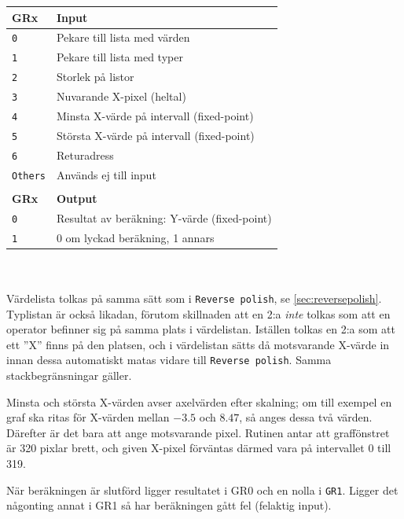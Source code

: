 \documentclass[]{article}
\begin{document}
\begin{tabular}{ll}
	\textbf{GRx}    & \textbf{Input}               \\ \hline
	\texttt{0}      & Pekare till lista med värden \\
	\texttt{1}      & Pekare till lista med typer  \\
	\texttt{2}      & Storlek på listor            \\
	\texttt{3}      & Nuvarande X-pixel (heltal)   \\
	\texttt{4}      & Minsta X-värde på intervall (fixed-point) \\
	\texttt{5}      & Största X-värde på intervall (fixed-point) \\
        \texttt{6}      & Returadress                  \\
        \texttt{Others} & Används ej till input        \\
                        &                              \\
	\textbf{GRx}    & \textbf{Output}              \\ \hline
	\texttt{0}      & Resultat av beräkning: Y-värde (fixed-point) \\
	\texttt{1}      & 0 om lyckad beräkning, 1 annars
\end{tabular}
\\\\
\noindent
Värdelista tolkas på samma sätt som i \texttt{Reverse polish}, se \ref{sec:reversepolish}. Typlistan är också likadan, förutom skillnaden att en 2:a \textit{inte} tolkas som att en operator befinner sig på samma plats i värdelistan. Iställen tolkas en 2:a som att ett ''X'' finns på den platsen, och i värdelistan sätts då motsvarande X-värde in innan dessa automatiskt matas vidare till \texttt{Reverse polish}. Samma stackbegränsningar gäller.

Minsta och största X-värden avser axelvärden efter skalning; om till exempel en graf ska ritas för X-värden mellan $-3.5$ och $8.47$, så anges dessa två värden. Därefter är det bara att ange motsvarande pixel. Rutinen antar att graffönstret är 320 pixlar brett, och given X-pixel förväntas därmed vara på intervallet 0 till 319.

När beräkningen är slutförd ligger resultatet i GR0 och en nolla i \texttt{GR1}. Ligger det någonting annat i GR1 så har beräkningen gått fel (felaktig input).
\end{document}

